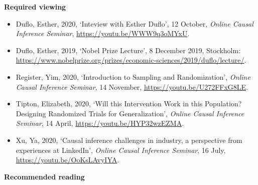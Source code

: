 \documentclass[
]{book}
\providecommand{\tightlist}{%
  \setlength{\itemsep}{0pt}\setlength{\parskip}{0pt}}
\begin{document}
\textbf{Required viewing}

\begin{itemize}
\tightlist
\item
  Duflo, Esther, 2020, `Inteview with Esther Duflo', 12 October, \emph{Online Causal Inference Seminar}, \url{https://youtu.be/WWW9q3oMYxU}.
\item
  Duflo, Esther, 2019, `Nobel Prize Lecture', 8 December 2019, Stockholm: \url{https://www.nobelprize.org/prizes/economic-sciences/2019/duflo/lecture/}.
\item
  Register, Yim, 2020, `Introduction to Sampling and Randomization', \emph{Online Causal Inference Seminar}, 14 November, \url{https://youtu.be/U272FFxG8LE}.
\item
  Tipton, Elizabeth, 2020, `Will this Intervention Work in this Population? Designing Randomized Trials for Generalization', \emph{Online Causal Inference Seminar}, 14 April, \url{https://youtu.be/HYP32wzEZMA}.
\item
  Xu, Ya, 2020, `Causal inference challenges in industry, a perspective from experiences at LinkedIn', \emph{Online Causal Inference Seminar}, 16 July, \url{https://youtu.be/OoKsLAvyIYA}.
\end{itemize}

\textbf{Recommended reading}
\end{document}
